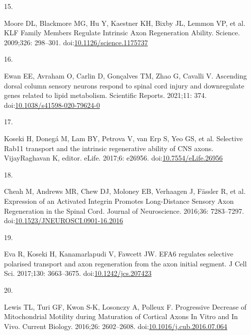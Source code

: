 \documentclass[
  12pt,
  a4paper,
]{article}
\newlength{\cslhangindent}
\newlength{\csllabelwidth}
\newlength{\cslentryspacingunit} %
\newenvironment{CSLReferences}[2] %
 {%
  \setlength{\parindent}{0pt}
  \ifodd #1
  \let\oldpar\par
  \def\par{\hangindent=\cslhangindent\oldpar}
  \fi
  \setlength{\parskip}{#2\cslentryspacingunit}
 }%
 {}
\newcommand{\CSLLeftMargin}[1]{\parbox[t]{\csllabelwidth}{#1}}
\newcommand{\CSLRightInline}[1]{\parbox[t]{\linewidth - \csllabelwidth}{#1}\break}
\begin{document}
\begin{CSLReferences}{0}{0}
\leavevmode{}%
\CSLLeftMargin{15. }%
\CSLRightInline{Moore DL, Blackmore MG, Hu Y, Kaestner KH, Bixby JL,
Lemmon VP, et al. {KLF Family Members Regulate Intrinsic Axon
Regeneration Ability}. Science. 2009;326: 298--301.
doi:\href{https://doi.org/10.1126/science.1175737}{10.1126/science.1175737}}

\leavevmode{}%
\CSLLeftMargin{16. }%
\CSLRightInline{Ewan EE, Avraham O, Carlin D, Gonçalves TM, Zhao G,
Cavalli V. Ascending dorsal column sensory neurons respond to spinal
cord injury and downregulate genes related to lipid metabolism.
Scientific Reports. 2021;11: 374.
doi:\href{https://doi.org/10.1038/s41598-020-79624-0}{10.1038/s41598-020-79624-0}}

\leavevmode{}%
\CSLLeftMargin{17. }%
\CSLRightInline{Koseki H, Donegá M, Lam BY, Petrova V, van Erp S, Yeo
GS, et al. Selective Rab11 transport and the intrinsic regenerative
ability of {CNS} axons. VijayRaghavan K, editor. eLife. 2017;6: e26956.
doi:\href{https://doi.org/10.7554/eLife.26956}{10.7554/eLife.26956}}

\leavevmode{}%
\CSLLeftMargin{18. }%
\CSLRightInline{Cheah M, Andrews MR, Chew DJ, Moloney EB, Verhaagen J,
Fässler R, et al. Expression of an {Activated Integrin Promotes
Long-Distance Sensory Axon Regeneration} in the {Spinal Cord}. Journal
of Neuroscience. 2016;36: 7283--7297.
doi:\href{https://doi.org/10.1523/JNEUROSCI.0901-16.2016}{10.1523/JNEUROSCI.0901-16.2016}}

\leavevmode{}%
\CSLLeftMargin{19. }%
\CSLRightInline{Eva R, Koseki H, Kanamarlapudi V, Fawcett JW. {EFA6}
regulates selective polarised transport and axon regeneration from the
axon initial segment. J Cell Sci. 2017;130: 3663--3675.
doi:\href{https://doi.org/10.1242/jcs.207423}{10.1242/jcs.207423}}

\leavevmode{}%
\CSLLeftMargin{20. }%
\CSLRightInline{Lewis TL, Turi GF, Kwon S-K, Losonczy A, Polleux F.
Progressive {Decrease} of {Mitochondrial Motility} during {Maturation}
of {Cortical Axons In Vitro} and {In Vivo}. Current Biology. 2016;26:
2602--2608.
doi:\href{https://doi.org/10.1016/j.cub.2016.07.064}{10.1016/j.cub.2016.07.064}}


\end{CSLReferences}
\end{document}
